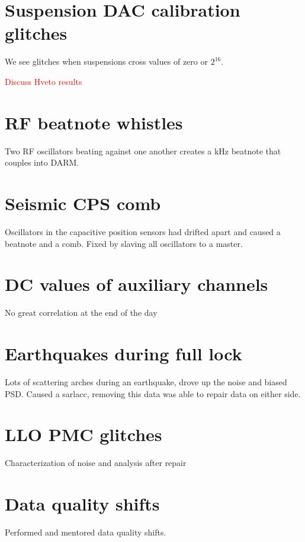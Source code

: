 \section{Suspension DAC calibration glitches}

We see glitches when suspensions cross values of zero or $2^{16}$.

\textcolor{red}{Discuss Hveto results}

\section{RF beatnote whistles}

Two RF oscillators beating against one another creates a kHz beatnote that couples 
into DARM.

\section{Seismic CPS comb}

Oscillators in the capacitive position sensors had drifted apart and caused a 
beatnote and a comb. Fixed by slaving all oscillators to a master.

\section{DC values of auxiliary channels}

No great correlation at the end of the day 

\section{Earthquakes during full lock}

Lots of scattering arches during an earthquake, drove up the noise and biased PSD.
Caused a sarlacc, removing this data was able to repair data on either side.

\section{LLO PMC glitches}

Characterization of noise and analysis after repair

\section{Data quality shifts}
Performed and mentored data quality shifts.



